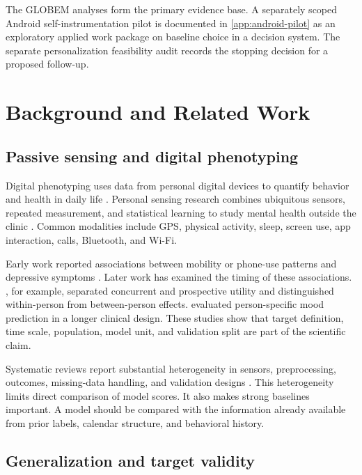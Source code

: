 \documentclass[a4paper,11pt,oneside]{report}
\begin{document}
The GLOBEM analyses form the primary evidence base. A separately scoped Android
self-instrumentation pilot is documented in \cref{app:android-pilot} as an
exploratory applied work package on baseline choice in a decision system. The
separate personalization feasibility audit records the stopping decision for a
proposed follow-up.

\chapter{Background and Related Work}
\label{ch:background}

\section{Passive sensing and digital phenotyping}

Digital phenotyping uses data from personal digital devices to quantify behavior and
health in daily life \citep{onnela2016digital}. Personal sensing research combines
ubiquitous sensors, repeated measurement, and statistical learning to study mental
health outside the clinic \citep{mohr2017personal}. Common modalities include GPS,
physical activity, sleep, screen use, app interaction, calls, Bluetooth, and Wi-Fi.

Early work reported associations between mobility or phone-use patterns and
depressive symptoms \citep{saeb2015mobile}. Later work has examined the timing of
these associations. \citet{stamatis2024differential}, for example, separated
concurrent and prospective utility and distinguished within-person from
between-person effects. \citet{balliu2024personalized} evaluated person-specific mood
prediction in a longer clinical design. These studies show that target definition,
time scale, population, model unit, and validation split are part of the scientific
claim.

Systematic reviews report substantial heterogeneity in sensors, preprocessing,
outcomes, missing-data handling, and validation designs \citep{deangel2022digital}.
This heterogeneity limits direct comparison of model scores. It also makes strong
baselines important. A model should be compared with the information already
available from prior labels, calendar structure, and behavioral history.

\section{Generalization and target validity}
\end{document}
